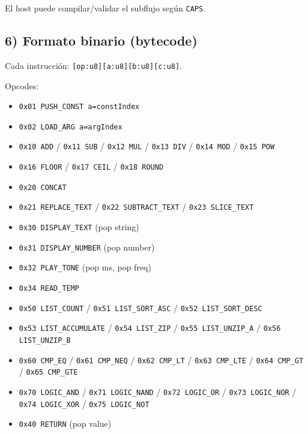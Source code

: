 El host puede compilar/validar el subflujo según \texttt{CAPS}.

\subsection*{6) Formato binario (bytecode)}

Cada instrucción: \texttt{[op:u8][a:u8][b:u8][c:u8]}.

Opcodes:
\begin{itemize}
    \item \texttt{0x01 PUSH\_CONST a=constIndex}
    \item \texttt{0x02 LOAD\_ARG a=argIndex}
    \item \texttt{0x10 ADD} / \texttt{0x11 SUB} / \texttt{0x12 MUL} / \texttt{0x13 DIV} / \texttt{0x14 MOD} / \texttt{0x15 POW}
    \item \texttt{0x16 FLOOR} / \texttt{0x17 CEIL} / \texttt{0x18 ROUND}
    \item \texttt{0x20 CONCAT}
    \item \texttt{0x21 REPLACE\_TEXT} / \texttt{0x22 SUBTRACT\_TEXT} / \texttt{0x23 SLICE\_TEXT}
    \item \texttt{0x30 DISPLAY\_TEXT} (pop string)
    \item \texttt{0x31 DISPLAY\_NUMBER} (pop number)
    \item \texttt{0x32 PLAY\_TONE} (pop ms, pop freq)
    \item \texttt{0x34 READ\_TEMP}
    \item \texttt{0x50 LIST\_COUNT} / \texttt{0x51 LIST\_SORT\_ASC} / \texttt{0x52 LIST\_SORT\_DESC}
    \item \texttt{0x53 LIST\_ACCUMULATE} / \texttt{0x54 LIST\_ZIP} / \texttt{0x55 LIST\_UNZIP\_A} / \texttt{0x56 LIST\_UNZIP\_B}
    \item \texttt{0x60 CMP\_EQ} / \texttt{0x61 CMP\_NEQ} / \texttt{0x62 CMP\_LT} / \texttt{0x63 CMP\_LTE} / \texttt{0x64 CMP\_GT} / \texttt{0x65 CMP\_GTE}
    \item \texttt{0x70 LOGIC\_AND} / \texttt{0x71 LOGIC\_NAND} / \texttt{0x72 LOGIC\_OR} / \texttt{0x73 LOGIC\_NOR} / \texttt{0x74 LOGIC\_XOR} / \texttt{0x75 LOGIC\_NOT}
    \item \texttt{0x40 RETURN} (pop value)
\end{itemize}

